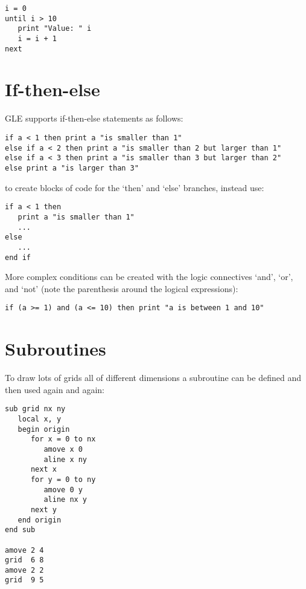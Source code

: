 \preglecode{}
\begin{Verbatim}
i = 0
until i > 10
   print "Value: " i
   i = i + 1
next
\end{Verbatim}
\postglecode{}

\section{If-then-else}

GLE supports if-then-else statements as follows:

\preglecode{}
\begin{Verbatim}
if a < 1 then print a "is smaller than 1"
else if a < 2 then print a "is smaller than 2 but larger than 1"
else if a < 3 then print a "is smaller than 3 but larger than 2"
else print a "is larger than 3"
\end{Verbatim}
\postglecode{}

\noindent{}to create blocks of code for the `then' and `else' branches, instead use:

\preglecode{}
\begin{Verbatim}
if a < 1 then
   print a "is smaller than 1"
   ...
else
   ...
end if
\end{Verbatim}
\postglecode{}

More complex conditions can be created with the logic connectives `{\sf and}', `{\sf or}', and `{\sf not}' (note the parenthesis around the logical expressions):

\preglecode{}
\begin{Verbatim}
if (a >= 1) and (a <= 10) then print "a is between 1 and 10"
\end{Verbatim}
\postglecode{}

\section{Subroutines}

To draw lots of grids all of different dimensions a subroutine can
be defined and then used again and again:

\preglecode{}
\begin{Verbatim}
sub grid nx ny 
   local x, y
   begin origin
      for x = 0 to nx
         amove x 0 
         aline x ny 
      next x
      for y = 0 to ny
         amove 0 y 
         aline nx y 
      next y 
   end origin
end sub
     
amove 2 4
grid  6 8
amove 2 2
grid  9 5
\end{Verbatim}
\postglecode{}

